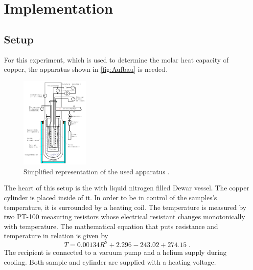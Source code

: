 \section{Implementation}
\label{sec:Aufbau}

\subsection{Setup}
For this experiment, which is used to determine the molar heat capacity of copper, the apparatus shown in \autoref{fig:Aufbau} is needed.
\begin{figure}
    \begin{center}
        \includegraphics[width=0.3\textwidth]{Aufbau.pdf}
        \caption{Simplified representation of the used apparatus \cite{ap47}.}
        \label{fig:Aufbau}
    \end{center} 
\end{figure}
The heart of this setup is the with liquid nitrogen filled Dewar vessel. The copper cylinder is placed inside of it. In order to be in control of the samples's temperature, it is surrounded by a heating coil.
The temperature is measured by two PT-100 measuring resistors whose electrical resistant changes monotonically with temperature.
The mathematical equation that puts resistance and temperature in relation is given by 
\begin{equation*}
    T=0.00134 R^2+2.296-243.02+274.15\; . 
\end{equation*}
The recipient is connected to a vacuum pump and a helium supply during cooling. Both sample and cylinder are supplied with a heating voltage.


